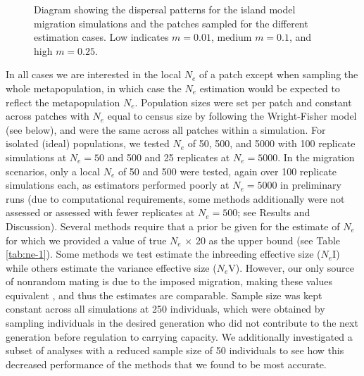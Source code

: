 \begin{figure}[]
\centering
{}
\caption[~- Diagram showing the dispersal patterns for the simulated population demographies.]{Diagram showing the dispersal patterns for the island model migration simulations and the patches 
sampled for the different estimation cases. Low indicates $m = 0.01$, medium $m = 0.1$, and high $m = 0.25$.}
\label{fig:ne-1}
\end{figure}

In all cases we are interested in the local $N_e$ of a patch except when sampling 
the whole metapopulation, in which case the $N_e$ estimation would be expected to 
reflect the metapopulation $N_e$. Population sizes were set per patch and constant 
across patches with $N_e$ equal to census size by following the Wright-Fisher model 
(see below), and were the same across all patches within a simulation. For isolated (ideal) 
populations, we tested $N_e$ of 50, 500, and 5000 with 100 replicate simulations at 
$N_e = 50$ and 500 and 25 replicates at $N_e = 500$0. In the migration scenarios, 
only a local $N_e$ of 50 and 500 were tested, again over 100 replicate simulations each, 
as estimators performed poorly at $N_e = 500$0 in preliminary runs (due to computational 
requirements, some methods additionally were not assessed or assessed with fewer replicates at 
$N_e = 500$; see Results and Discussion). Several methods require that a prior be given 
for the estimate of $N_e$ for which we provided a value of true $N_e$ $\times$ 20 as 
the upper bound (see Table \ref{tab:ne-1}). Some methods we test estimate the inbreeding effective size 
($N_e$I) while others estimate the variance effective size ($N_e$V). However, 
our only source of nonrandom mating is due to the imposed migration, making these values 
equivalent \citep{Hill:1979}, and thus the estimates are comparable. Sample size was kept constant 
across all simulations at 250 individuals, which were obtained by sampling individuals in the 
desired generation who did not contribute to the next generation before regulation to carrying 
capacity. We additionally investigated a subset of analyses with a reduced sample size of 50 
individuals to see how this decreased performance of the methods that we found to be most accurate.

